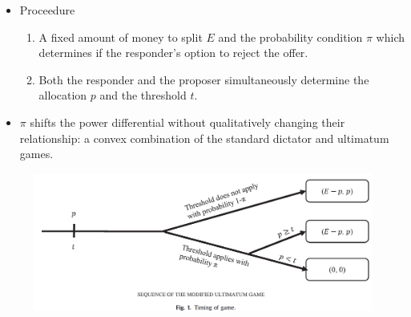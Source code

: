 \documentclass[../root]{subfiles}
\begin{document}
    \begin{itemize}
      \item Proceedure
      \begin{enumerate}
        \item A fixed amount of money to split $E$ and the probability condition $\pi$ which determines if the responder's option to reject the offer.
        \item Both the responder and the proposer simultaneously determine the allocation $p$ and the threshold $t$.
      \end{enumerate}
      \item $\pi$ shifts the power differential without qualitatively changing their relationship: a convex combination of the standard dictator and ultimatum games.
    \end{itemize}


    \begin{figure}[ht]
        \centering
        \includegraphics[scale = .8]{1106tanji/F1}
    \end{figure}
\end{document}
